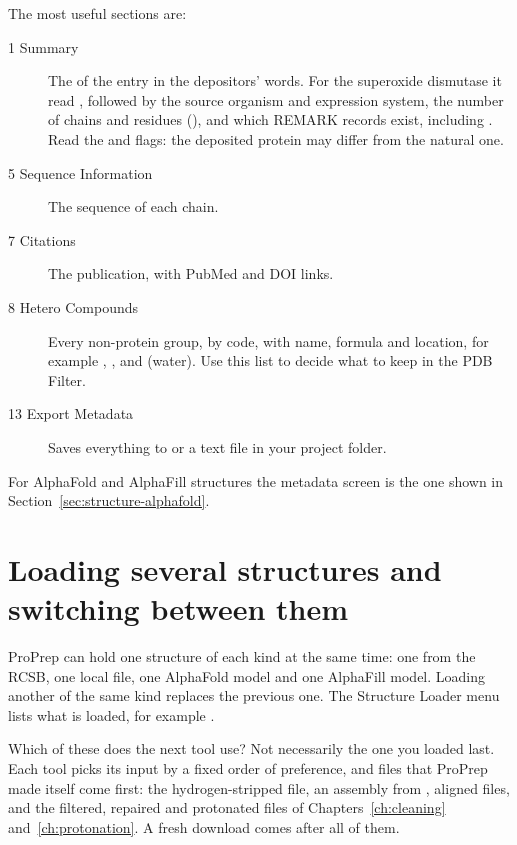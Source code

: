 The most useful sections are:
\begin{description}
  \item[1 Summary] The  of the entry in the depositors' words.
        For the superoxide dismutase  it read
        , followed by the
        source organism and expression system, the number of chains and
        residues (), and which REMARK records
        exist, including .
        Read the  and  flags: the
        deposited protein may differ from the natural one.
  \item[5 Sequence Information] The sequence of each chain.
  \item[7 Citations] The publication, with PubMed and DOI links.
  \item[8 Hetero Compounds] Every non-protein group, by code, with name,
        formula and location, for example , , and
         (water). Use this list to decide what to keep in the PDB
        Filter.
  \item[13 Export Metadata] Saves everything to  or a
        text file in your project folder.
\end{description}

For AlphaFold and AlphaFill structures the metadata screen is the one shown in
Section~\ref{sec:structure-alphafold}.

\section{Loading several structures and switching between them}
\label{sec:structure-switching}

ProPrep can hold one structure of each kind at the same time: one from the
RCSB, one local file, one AlphaFold model and one AlphaFill model. Loading
another of the same kind replaces the previous one. The Structure Loader menu
lists what is loaded, for example
.

Which of these does the next tool use? Not necessarily the one you loaded last.
Each tool picks its input by a fixed order of preference, and files that
ProPrep made itself come first: the hydrogen-stripped  file, an
assembly from , aligned files, and the filtered, repaired and
protonated files of Chapters~\ref{ch:cleaning} and~\ref{ch:protonation}. A fresh
download comes after all of them.


